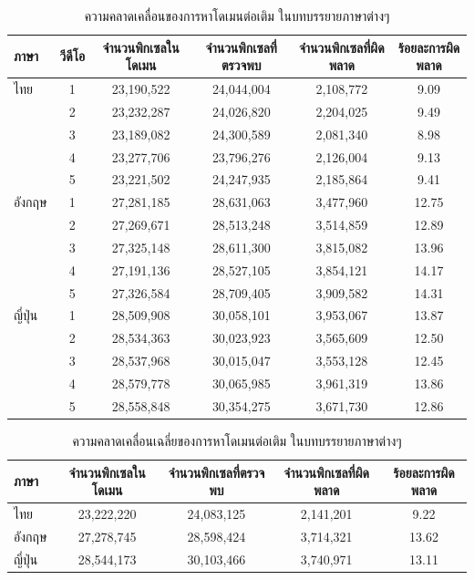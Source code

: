     \begin{table}[H]
		\centering
		\footnotesize
		\begin{tabular}[ht]{|l|c|c|c|c|c|}
			\hline
			ภาษา  & วีดีโอ & จำนวนพิกเซลในโดเมน & จำนวนพิกเซลที่ตรวจพบ & จำนวนพิกเซลที่ผิดพลาด & ร้อยละการผิดพลาด \\
			\hline
			ไทย & 1 & 23,190,522  & 24,044,004 & 2,108,772 &9.09\\
				 & 2 & 23,232,287 & 24,026,820 & 2,204,025 & 9.49\\
				& 3 & 23,189,082 & 24,300,589 & 2,081,340 & 8.98\\
				& 4 & 23,277,706 & 23,796,276  & 2,126,004 & 9.13\\
				& 5 & 23,221,502 & 24,247,935 & 2,185,864 & 9.41\\
			\hline
			อังกฤษ & 1 & 27,281,185 & 28,631,063 & 3,477,960  & 12.75\\
			& 2 & 27,269,671 & 28,513,248 & 3,514,859 & 12.89\\
			& 3 & 27,325,148 & 28,611,300 & 3,815,082 & 13.96\\
			& 4 & 27,191,136 & 28,527,105 & 3,854,121 & 14.17\\
			& 5 & 27,326,584 & 28,709,405 & 3,909,582 & 14.31\\
			\hline
			ญี่ปุ่น & 1 & 28,509,908 & 30,058,101 &  3,953,067 & 13.87\\
			& 2 & 28,534,363  & 30,023,923 & 3,565,609 & 12.50\\
			& 3 & 28,537,968 & 30,015,047 & 3,553,128 & 12.45\\
			& 4 & 28,579,778 & 30,065,985 & 3,961,319 & 13.86\\
			& 5 & 28,558,848 & 30,354,275 & 3,671,730 & 12.86\\
			\hline
		\end{tabular}
		\caption{ความคลาดเคลื่อนของการหาโดเมนต่อเติม ในบทบรรยายภาษาต่างๆ}
	\end{table}
	\begin{table}[H]
		\centering
			\footnotesize
		\begin{tabular}[ht]{|l|c|c|c|c|}
			\hline
			ภาษา  & จำนวนพิกเซลในโดเมน & จำนวนพิกเซลที่ตรวจพบ & จำนวนพิกเซลที่ผิดพลาด & ร้อยละการผิดพลาด \\
			\hline
			ไทย & 23,222,220 & 24,083,125 & 2,141,201 & 9.22 \\
			อังกฤษ & 27,278,745 & 28,598,424 & 3,714,321 & 13.62 \\
			ญี่ปุ่น & 28,544,173 & 30,103,466 & 3,740,971 & 13.11 \\
			\hline
		\end{tabular}
		\caption{ความคลาดเคลื่อนเฉลี่ยของการหาโดเมนต่อเติม ในบทบรรยายภาษาต่างๆ}
	\end{table}	
	
